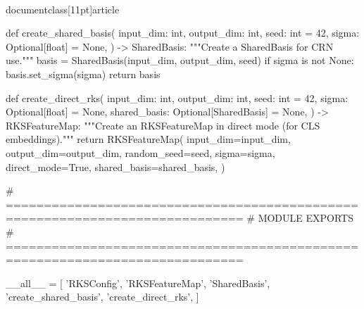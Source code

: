 \\documentclass[11pt]{article}
\begin{document}
\begin{CodeBlock}
def create_shared_basis(
    input_dim: int,
    output_dim: int,
    seed: int = 42,
    sigma: Optional[float] = None,
) -> SharedBasis:
    """Create a SharedBasis for CRN use."""
    basis = SharedBasis(input_dim, output_dim, seed)
    if sigma is not None:
        basis.set_sigma(sigma)
    return basis


def create_direct_rks(
    input_dim: int,
    output_dim: int,
    seed: int = 42,
    sigma: Optional[float] = None,
    shared_basis: Optional[SharedBasis] = None,
) -> RKSFeatureMap:
    """Create an RKSFeatureMap in direct mode (for CLS embeddings)."""
    return RKSFeatureMap(
        input_dim=input_dim,
        output_dim=output_dim,
        random_seed=seed,
        sigma=sigma,
        direct_mode=True,
        shared_basis=shared_basis,
    )


# =============================================================================
# MODULE EXPORTS
# =============================================================================

__all__ = [
    'RKSConfig',
    'RKSFeatureMap',
    'SharedBasis',
    'create_shared_basis',
    'create_direct_rks',
]
\end{CodeBlock}
\end{document}
